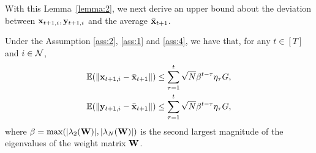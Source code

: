 With this Lemma~\ref{lemma:2}, we next derive an upper bound about the deviation between $\mathbf{x}_{t+1,i},\mathbf{y}_{t+1,i}$ and the average $\bar{\mathbf{x}}_{t+1}$.
	\begin{lemma}\label{lemma:3}
		Under the Assumption \ref{ass:2}, \ref{ass:1}  and \ref{ass:4}, we have that, for any $t\in[T]$ and $i\in\mathcal{N}$, 
		\begin{equation*}
			\begin{aligned}
				&\mathbb{E}(\|\mathbf{x}_{t+1,i}-\bar{\mathbf{x}}_{t+1}\|)\le \sum_{\tau=1}^{t}\sqrt{N}\beta^{t-\tau}\eta_{\tau}G,\\
				&\mathbb{E}(\|\mathbf{y}_{t+1,i}-\bar{\mathbf{x}}_{t+1}\|)\le \sum_{\tau=1}^{t}\sqrt{N}\beta^{t-\tau}\eta_{\tau}G,
			\end{aligned}
		\end{equation*} where $\beta=\max(|\lambda_{2}(\mathbf{W})|,|\lambda_{N}(\mathbf{W})|)$ is the second largest magnitude of the eigenvalues of the weight matrix $\mathbf{W}$.
	\end{lemma}
